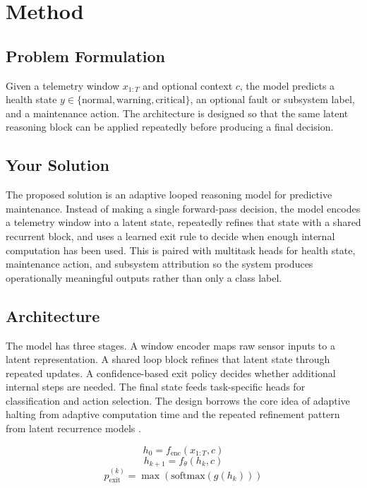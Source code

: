 \section{Method}
\subsection{Problem Formulation}
Given a telemetry window $x_{1:T}$ and optional context $c$, the model predicts a health state $y \in \{\text{normal}, \text{warning}, \text{critical}\}$, an optional fault or subsystem label, and a maintenance action. The architecture is designed so that the same latent reasoning block can be applied repeatedly before producing a final decision.

\subsection{Your Solution}
The proposed solution is an adaptive looped reasoning model for predictive maintenance. Instead of making a single forward-pass decision, the model encodes a telemetry window into a latent state, repeatedly refines that state with a shared recurrent block, and uses a learned exit rule to decide when enough internal computation has been used. This is paired with multitask heads for health state, maintenance action, and subsystem attribution so the system produces operationally meaningful outputs rather than only a class label.

\subsection{Architecture}
The model has three stages. A window encoder maps raw sensor inputs to a latent representation. A shared loop block refines that latent state through repeated updates. A confidence-based exit policy decides whether additional internal steps are needed. The final state feeds task-specific heads for classification and action selection. The design borrows the core idea of adaptive halting from adaptive computation time and the repeated refinement pattern from latent recurrence models \cite{Graves2016ACT,Dehghani2018UniversalTransformers,Banino2021PonderNet}.

\begin{equation}
h_0 = f_{\text{enc}}(x_{1:T}, c)
\end{equation}
\begin{equation}
h_{k+1} = f_{\theta}(h_k, c)
\end{equation}
\begin{equation}
p_{\text{exit}}^{(k)} = \max \left(\text{softmax}(g(h_k))\right)
\end{equation}

